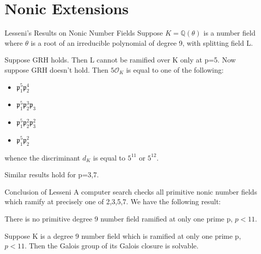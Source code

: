 \documentclass[10pt]{beamer}
\theoremstyle{plain} %
\begin{document}
\section{Nonic Extensions}
\begin{frame}{Lesseni's Results on Nonic Number Fields}
   Suppose $K=\mathbb{Q}(\theta)$ is a number field where $\theta$ is a root of an irreducible polynomial of degree 9, with splitting field L. \begin{theorem}
    Suppose GRH holds. Then L cannot be ramified over K only at p=5. Now suppose GRH doesn't hold. Then $5\mathcal{O}_K$ is equal to one of the following: \begin{itemize}
        \item $\mathfrak{p}_1^5\mathfrak{p}_2^4$
        \item $\mathfrak{p}_1^5\mathfrak{p}_2^3\mathfrak{p}_3$
        \item $\mathfrak{p}_1^5\mathfrak{p}_2^2\mathfrak{p}_3^2$
        \item  $\mathfrak{p}_1^5\mathfrak{p}_2^2$
    \end{itemize}
    whence the discriminant $d_K$ is equal to $5^{11}$ or $5^{12}$. 
\end{theorem} 
Similar results hold for p=3,7. 
\end{frame}
\begin{frame}{Conclusion of Lesseni}
    A computer search checks all primitive nonic number fields which ramify at precisely one of 2,3,5,7. We have the following result:
    \begin{theorem}
    There is no primitive degree 9 number field ramified at only one prime p, $p<11$.
\end{theorem}
\begin{corollary}
 Suppose K is a degree 9 number field which is ramified at only one prime p, $p<11$. Then the Galois group of its Galois closure is solvable. 
\end{corollary}
\end{frame}
\end{document}
